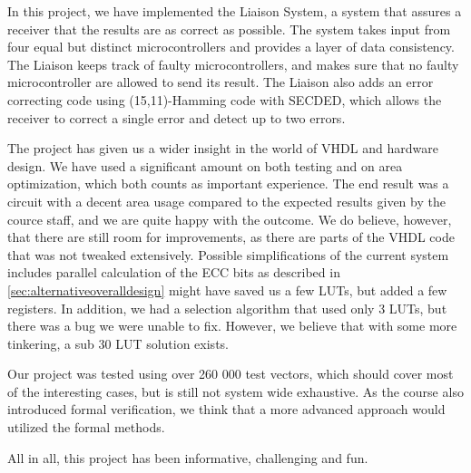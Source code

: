 In this project, we have implemented the Liaison System, a system that assures a receiver that the results are as correct as possible.
The system takes input from four equal but distinct microcontrollers and provides a layer of data consistency. The Liaison keeps track
of faulty microcontrollers, and makes sure that no faulty microcontroller are allowed to send its result. The Liaison also adds an error
correcting code using (15,11)-Hamming code with SECDED, which allows the receiver to correct a single error and detect up to two errors.

The project has given us a wider insight in the world of VHDL and hardware design. We have used a significant amount on both testing and
on area optimization, which both counts as important experience. The end result was a circuit with a decent area usage compared to the
expected results given by the cource staff, and we are quite happy with the outcome. We do believe, however, that there are still room for
improvements, as there are parts of the VHDL code that was not tweaked extensively. Possible simplifications of the current system includes
parallel calculation of the ECC bits as described in \autoref{sec:alternativeoveralldesign} might have saved us a few LUTs, but added a few
registers. In addition, we had a selection algorithm that used only 3 LUTs, but there was a bug we were unable to fix. However, we believe
that with some more tinkering, a sub 30 LUT solution exists.

Our project was tested using over 260 000 test vectors, which should cover most of the interesting cases, but is still not system wide
exhaustive. As the course also introduced formal verification, we think that a more advanced approach would utilized the formal methods.

All in all, this project has been informative, challenging and fun.
